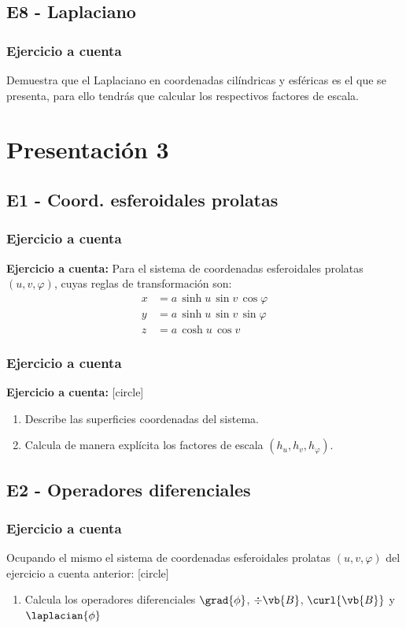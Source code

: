 \subsection{E8 - Laplaciano}
\begin{frame}
\frametitle{Ejercicio a cuenta}
Demuestra que el Laplaciano en coordenadas cilíndricas y esféricas es el que se presenta, para ello tendrás que calcular los respectivos factores de escala.
\end{frame}
\section{Presentación 3}
\subsection{E1 - Coord. esferoidales prolatas}
\begin{frame}
\frametitle{Ejercicio a cuenta}
\textbf{Ejercicio a cuenta: } 
Para el sistema de coordenadas esferoidales prolatas $(u, v, \varphi)$, cuyas reglas de transformación son:
\begin{align*}
x &= a \, \sinh u \, \sin v \, \cos \varphi \\
y &= a \, \sinh u \, \sin v \, \sin \varphi \\
z &= a \, \cosh u \, \cos v
\end{align*}
\end{frame}
\begin{frame}
\frametitle{Ejercicio a cuenta}
\textbf{Ejercicio a cuenta: } 
[circle]
\begin{enumerate}
\item Describe las superficies coordenadas del sistema.
\item Calcula de manera explícita los factores de escala $(h_{u}, h_{v}, h_{\varphi})$.
\end{enumerate}
\end{frame}
\subsection{E2 - Operadores diferenciales}
\begin{frame}
\frametitle{Ejercicio a cuenta}
Ocupando el mismo el sistema de coordenadas esferoidales prolatas $(u, v, \varphi)$ del ejercicio a cuenta anterior:
[circle]
\begin{enumerate}
\item Calcula los operadores diferenciales $\grad{\phi}$, $\div{\vb{B}}$, $\curl{\vb{B}}$ y $\laplacian{\phi}$
\end{enumerate}
\end{frame}
